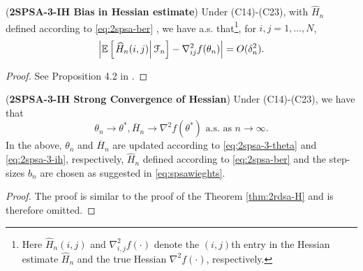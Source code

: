 \begin{lemma}(\textbf{2SPSA-3-IH Bias in Hessian estimate})
\label{lemma:2spsa-bias}
Under (C14)-(C23), with $\widehat H_n$ defined according to  \eqref{eq:2spsa-ber} , we have a.s. that\footnote{Here $\widehat H_n(i,j)$ and $\nabla^2_{i,j}f(\cdot)$ denote the $(i,j)$th entry in the Hessian estimate $\widehat H_n$ and the true Hessian $\nabla^2 f(\cdot)$, respectively.}, for $i,j = 1,\ldots,N$,
\begin{align}
\left|\mathbb{E}\left[
\left. \widehat H_n(i,j) \right| \mathcal{F}_n \right] - \nabla^2_{ij} f(\theta_n)\right| = O(\delta_n^2).
\end{align} 
\end{lemma}
\begin{proof}
See Proposition 4.2 in \cite{bhatnagar2015simultaneous}.
\end{proof}


\begin{theorem}(\textbf{2SPSA-3-IH Strong Convergence of Hessian})
\label{thm:2spsa-H}
Under (C14)-(C23), we have that 
$$\theta_n \rightarrow \theta^*, \overline H_n \rightarrow \nabla^2 f(\theta^*) \text{ a.s. as } n\rightarrow \infty.$$ 
In the above, $\theta_n$ and $\overline H_n$ are updated according to \eqref{eq:2spsa-3-theta} and \eqref{eq:2spsa-3-ih}, respectively, $\widehat H_n$ defined according to \eqref{eq:2spsa-ber} and the step-sizes $b_n$ are chosen as suggested in \eqref{eq:spsawieghts}. 
\end{theorem}
\begin{proof}
The proof is similar to the proof of the Theorem \ref{thm:2rdsa-H} and is therefore omitted.
\end{proof}

